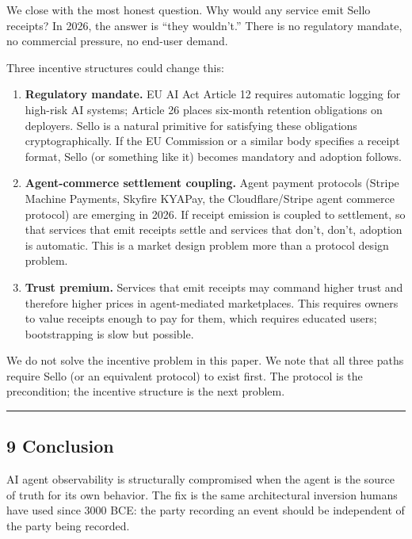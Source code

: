 \documentclass[
  11pt,
]{article}
\begin{document}
We close with the most honest question. Why would any service emit Sello
receipts? In 2026, the answer is ``they wouldn't.'' There is no
regulatory mandate, no commercial pressure, no end-user demand.

Three incentive structures could change this:

\begin{enumerate}
\def\labelenumi{\arabic{enumi}.}
\item
  \textbf{Regulatory mandate.} EU AI Act Article 12 requires automatic
  logging for high-risk AI systems; Article 26 places six-month
  retention obligations on deployers. Sello is a natural primitive for
  satisfying these obligations cryptographically. If the EU Commission
  or a similar body specifies a receipt format, Sello (or something like
  it) becomes mandatory and adoption follows.
\item
  \textbf{Agent-commerce settlement coupling.} Agent payment protocols
  (Stripe Machine Payments, Skyfire KYAPay, the Cloudflare/Stripe agent
  commerce protocol) are emerging in 2026. If receipt emission is
  coupled to settlement, so that services that emit receipts settle and
  services that don't, don't, adoption is automatic. This is a market
  design problem more than a protocol design problem.
\item
  \textbf{Trust premium.} Services that emit receipts may command higher
  trust and therefore higher prices in agent-mediated marketplaces. This
  requires owners to value receipts enough to pay for them, which
  requires educated users; bootstrapping is slow but possible.
\end{enumerate}

We do not solve the incentive problem in this paper. We note that all
three paths require Sello (or an equivalent protocol) to exist first.
The protocol is the precondition; the incentive structure is the next
problem.

\begin{center}\rule{0.5\linewidth}{0.5pt}\end{center}

\hypertarget{conclusion}{%
\subsection{9 Conclusion}\label{conclusion}}

AI agent observability is structurally compromised when the agent is the
source of truth for its own behavior. The fix is the same architectural
inversion humans have used since 3000 BCE: the party recording an event
should be independent of the party being recorded.
\end{document}
